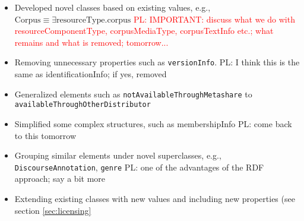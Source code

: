 \documentclass{llncs}
\begin{document}
{\begin{itemize}
(a) removed the Info suffix from the wrapping elements: e.g. validationInfo becomes simply validation {PL: check tomorrow all classes and make a list as promised}
(b) changed the names of elements that created confusion, as already noted by the META-SHARE group and/or the ld4lt group; thus, 'resource' was renamed 'languageResource', 'restrictionsOfUse' became 'conditionsOfUse', etc.
(c) {PL: I lost some text and I can't remember what I had here; tomorrow...}
(d) shortened some names such as ConformanceToBestStandardsAndPractices
\textcolor{red}{JPM: Perhaps we introduce sameAs links to handle this; PL: I think we decided against d; pls confirm}
\item Developed novel classes based on existing values, e.g.,
$\mathrm{Corpus} \equiv \exists \mathrm{resourceType}.\mathrm{corpus}$
\textcolor{red}{PL: IMPORTANT: discuss what we do with resourceComponentType, corpusMediaType, corpusTextInfo etc.; what remains and what is removed; tomorrow...}
\item Removing unnecessary properties such as {\tt versionInfo}.
{PL: I think this is the same as identificationInfo; if yes, removed}
\item Generalized elements such as {\tt notAvailableThroughMetashare} to {\tt availableThroughOtherDistributor}
\item Simplified some complex structures, such as membershipInfo
{PL: come back to this tomorrow}
\item Grouping similar elements under novel superclasses, e.g., {\tt DiscourseAnnotation}, {\tt genre}
{PL: one of the advantages of the RDF approach; say a bit more}
\item Extending existing classes with new values and including new properties (see section \ref{sec:licensing}
\end{itemize}
}
\end{document}
